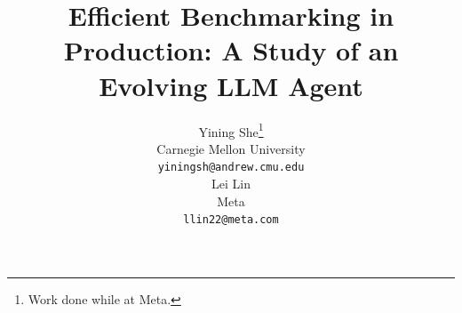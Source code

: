 \documentclass[11pt]{article}
\title{Efficient Benchmarking in Production: A Study of an Evolving LLM Agent}
\author{Yining She\thanks{Work done while at Meta.}  \\
  Carnegie Mellon University\\
  \texttt{yiningsh@andrew.cmu.edu} \\\And
  Lei Lin \\
  Meta\\
  \texttt{llin22@meta.com} \\}
\begin{document}
\maketitle

\begin{abstract}

\end{abstract}









% 



\appendix

\end{document}
